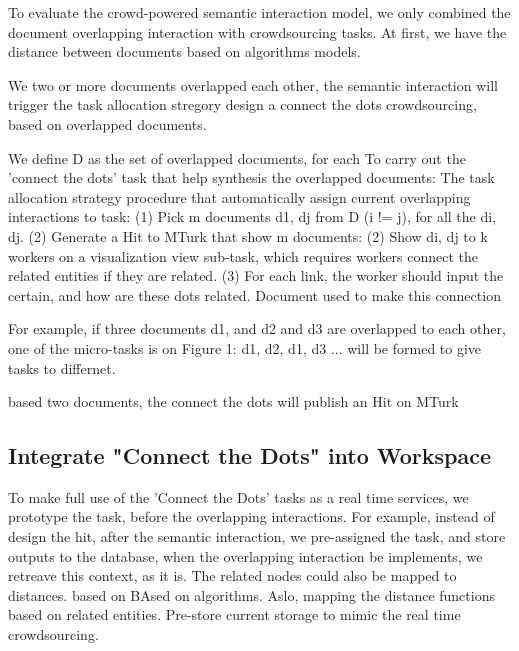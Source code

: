 \documentclass[journal]{vgtc}                %
\begin{document}
To evaluate the crowd-powered semantic interaction model, we only combined the document overlapping interaction with crowdsourcing tasks.
At first, we have the distance between documents based on algorithms models.

We two or more documents overlapped each other, the semantic interaction will trigger the task allocation stregory design a connect the dots crowdsourcing, based on overlapped documents.

We define D as the set of overlapped documents, for each
To carry out the 'connect the dots' task that help synthesis the overlapped documents:
The task allocation strategy procedure that automatically assign current overlapping interactions to task:\newline
(1) Pick m documents d1, dj from D (i != j), for all the di, dj. \newline
(2) Generate a Hit to MTurk that show m documents:
(2)	Show di, dj to k workers on a visualization view sub-task, which requires workers connect the related entities if they are related. \newline
(3) For each link, the worker should input the certain, and how are these dots related. Document used to make this connection \newline

For example, if three documents d1, and d2 and d3 are overlapped to each other, one of the micro-tasks is on Figure 1: {d1, d2}, {d1, d3} ... will be formed to give tasks to differnet.

based two documents, the connect the dots will publish an Hit on MTurk

\subsection{Integrate "Connect the Dots" into Workspace}
To make full use of the 'Connect the Dots' tasks as a real time services, we prototype the task, before the overlapping interactions.
For example, instead of design the hit, after the semantic interaction, we pre-assigned the task, and store outputs to the database, when the overlapping interaction be implements, we retreave this context, as it is.
The related nodes could also be mapped to distances. based on
BAsed on algorithms. Aslo, mapping the distance functions based on related entities.
Pre-store current storage to mimic the real time crowdsourcing.
\end{document}
